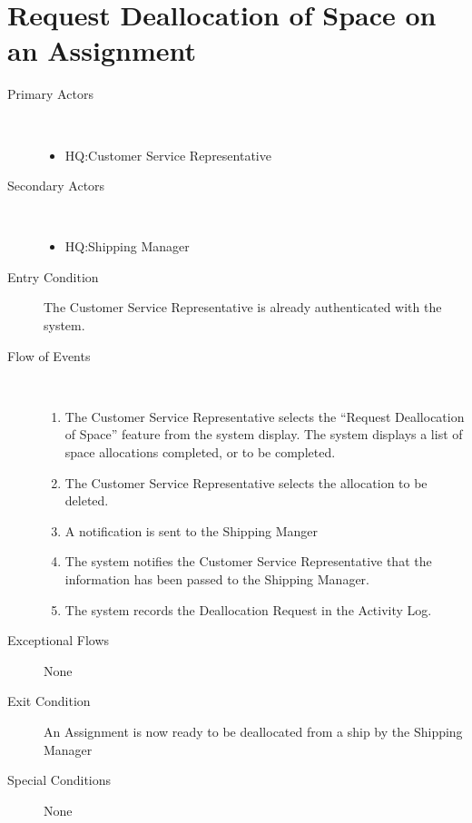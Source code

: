 \documentclass[a4paper,10pt]{report}
\begin{document}
\section{Request Deallocation of Space on an Assignment}
\begin{description}
\item[Primary Actors] \
  \begin{itemize}
    \item HQ:Customer Service Representative
  \end{itemize}
\item[Secondary Actors]\
  \begin{itemize}
    \item HQ:Shipping Manager
  \end{itemize}
\item[Entry Condition]
  The Customer Service Representative is already authenticated with the system.
\item[Flow of Events] \
  \begin{enumerate}
    \item The Customer Service Representative selects the ``Request Deallocation of Space'' feature from the system display. The system displays a list of space allocations completed, or to be completed.
    \item The Customer Service Representative selects the allocation to be deleted.
    \item A notification is sent to the Shipping Manger
    \item The system notifies the Customer Service Representative that the information has been passed to the Shipping Manager.
    \item The system records the Deallocation Request in the Activity Log.
  \end{enumerate}
\item[Exceptional Flows] None
\item[Exit Condition]
  An Assignment is now ready to be deallocated from a ship by the Shipping Manager
\item[Special Conditions] None
\end{description}
\end{document}
